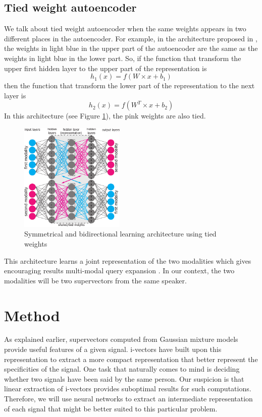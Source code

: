 \documentclass[conference]{IEEEtran}
\begin{document}
\subsection{Tied weight autoencoder}


We talk about tied weight autoencoder when the same weights appears in two
different places in the autoencoder. For example, in the architecture proposed
in \cite{vukotic:hal-01314302}, the weights in light blue in the upper part of the
autoencoder are the same as the weights in light blue in the lower part. So, if
the function that transform the upper first hidden layer to the upper part of
the representation is
\begin{equation}
 h_1(x) = f(W \times x + b_1)
\end{equation}
then  the function that transform the lower part of the representation to the
next layer is
\begin{equation}
 h_2(x) = f(W^T \times x + b_2)
\end{equation}
In this architecture (see Figure \ref{archi_vedran}), the pink weights are also tied.

\begin{figure}[!h]
    \centering
    \includegraphics[width=5cm]{archi-vedran.pdf}
    \caption{Symmetrical and bidirectional learning architecture using tied weights}
    \label{archi_vedran}
\end{figure}

This architecture learns a joint representation of the two modalities which gives encouraging results multi-modal query expansion \cite{vukotic:hal-01314302}. In our context, the two modalities will be two supervectors from the same speaker.

\section{Method}
\label{sec:Method}

As explained earlier, supervectors computed from Gaussian mixture models provide
useful features of a given signal. i-vectors have built upon this representation
to extract a more compact representation that better represent the
specificities of the signal.
One task that naturally comes to mind is deciding whether two signals have been
said by the same person. Our suspicion is that linear extraction of i-vectors
provides suboptimal results for such computations.
Therefore, we will use neural networks to extract an intermediate representation
of each signal that might be better suited to this particular problem.
\end{document}
